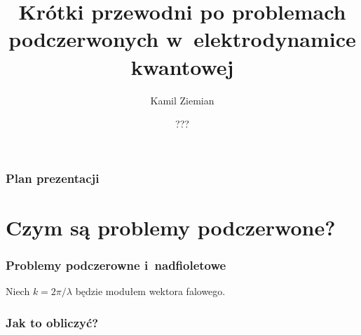 \documentclass[10pt,t]{beamer}
\title{Krótki przewodni po problemach podczerwonych
  w~elektrodynamice kwantowej}
\author{Kamil Ziemian \\
  \email}
\date[???]{???}
\begin{document}





\RaggedRight





\maketitle





\begin{frame}
  \frametitle{Plan prezentacji}


  \tableofcontents

\end{frame}










\section{Czym są problemy podczerwone?}



\begin{frame}
  \frametitle{Problemy podczerowne i~nadfioletowe}


  Niech $k = 2 \pi / \lambda$ będzie modułem wektora falowego.

\end{frame}





\begin{frame}
  \frametitle{Jak to obliczyć?}




\end{frame}
\end{document}

